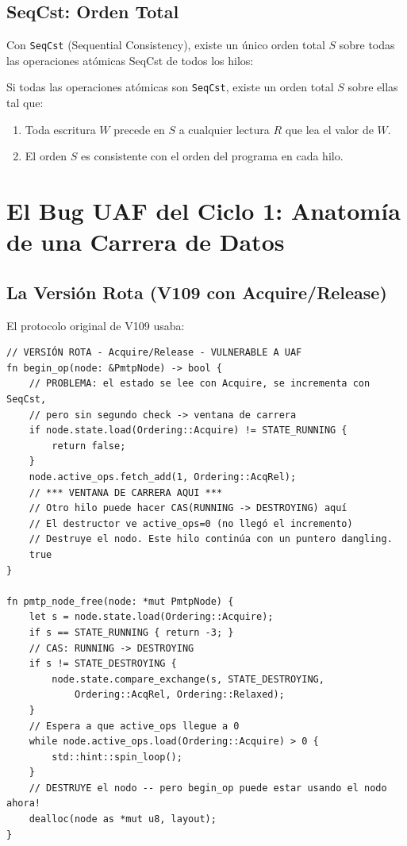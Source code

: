 \subsection{SeqCst: Orden Total}

Con \texttt{SeqCst} (Sequential Consistency), existe un único orden total $S$ sobre
todas las operaciones atómicas SeqCst de todos los hilos:

\begin{theorem}

Si todas las operaciones atómicas son \texttt{SeqCst}, existe un orden total $S$
sobre ellas tal que:
\begin{enumerate}
\item Toda escritura $W$ precede en $S$ a cualquier lectura $R$ que lea el valor de $W$.
\item El orden $S$ es consistente con el orden del programa en cada hilo.
\end{enumerate}
\end{theorem}

\section{El Bug UAF del Ciclo 1: Anatomía de una Carrera de Datos}

\subsection{La Versión Rota (V109 con Acquire/Release)}

El protocolo original de V109 usaba:

\begin{verbatim}
// VERSIÓN ROTA - Acquire/Release - VULNERABLE A UAF
fn begin_op(node: &PmtpNode) -> bool {
    // PROBLEMA: el estado se lee con Acquire, se incrementa con SeqCst,
    // pero sin segundo check -> ventana de carrera
    if node.state.load(Ordering::Acquire) != STATE_RUNNING {
        return false;
    }
    node.active_ops.fetch_add(1, Ordering::AcqRel);
    // *** VENTANA DE CARRERA AQUI ***
    // Otro hilo puede hacer CAS(RUNNING -> DESTROYING) aquí
    // El destructor ve active_ops=0 (no llegó el incremento)
    // Destruye el nodo. Este hilo continúa con un puntero dangling.
    true
}

fn pmtp_node_free(node: *mut PmtpNode) {
    let s = node.state.load(Ordering::Acquire);
    if s == STATE_RUNNING { return -3; }
    // CAS: RUNNING -> DESTROYING
    if s != STATE_DESTROYING {
        node.state.compare_exchange(s, STATE_DESTROYING, 
            Ordering::AcqRel, Ordering::Relaxed);
    }
    // Espera a que active_ops llegue a 0
    while node.active_ops.load(Ordering::Acquire) > 0 {
        std::hint::spin_loop();
    }
    // DESTRUYE el nodo -- pero begin_op puede estar usando el nodo ahora!
    dealloc(node as *mut u8, layout);
}
\end{verbatim}


